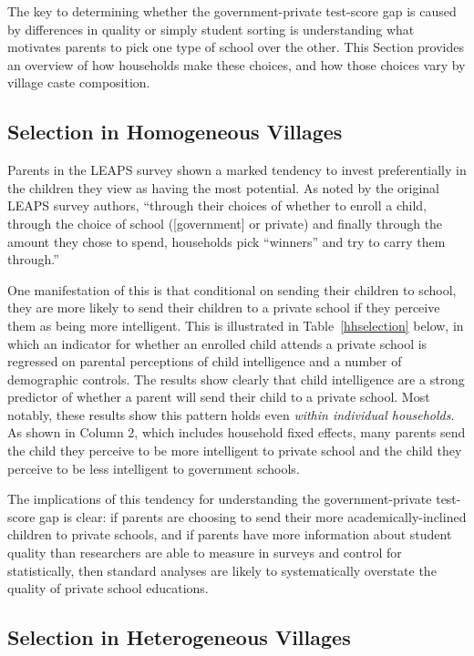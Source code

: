 \documentclass[Eubank_pk_ethnic_sorting.tex]{subfiles}
\begin{document}
The key to determining whether the government-private test-score gap is caused by differences in quality or simply student sorting is understanding what motivates parents to pick one type of school over the other. This Section provides an overview of how households make these choices, and how those choices vary by village caste composition.

\subsection{Selection in Homogeneous Villages}\label{}

Parents in the LEAPS survey shown a marked tendency to invest preferentially in the children they view as having the most potential. As noted by the original LEAPS survey authors, ``through their choices of whether to enroll a child, through the choice of school ([government] or private) and finally through the amount they chose to spend, households pick ``winners'' and try to carry them through.'' \citep[p. 103]{Andrabi:2007we}

One manifestation of this is that conditional on sending their children to school, they are more likely to send their children to a private school if they perceive them as being more intelligent. This is illustrated in Table~\ref{hhselection} below, in which an indicator for whether an enrolled child attends a private school is regressed on parental perceptions of child intelligence and a number of demographic controls. The results show clearly that child intelligence are a strong predictor of whether a parent will send their child to a private school. Most notably, these results show this pattern holds even \emph{within individual households}. As shown in Column 2, which includes household fixed effects, many parents send the child they perceive to be more intelligent to private school and the child they perceive to be less intelligent to government schools.



The implications of this tendency for understanding the government-private test-score gap is clear: if parents are choosing to send their more academically-inclined children to private schools, and if parents have more information about student quality than researchers are able to measure in surveys and control for statistically, then standard analyses are likely to systematically overstate the quality of private school educations.

\subsection{Selection in Heterogeneous Villages}\label{}
\end{document}

